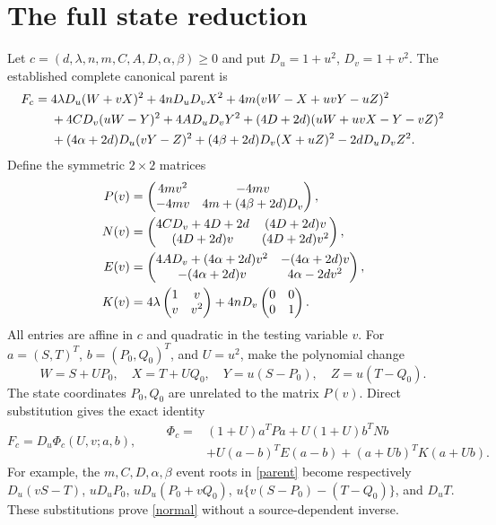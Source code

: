 \documentclass[11pt]{article}
\begin{document}
\section{The full state reduction}
Let $c=(d,\lambda,n,m,C,A,D,\alpha,\beta)\geq0$ and put
$D_u=1+u^2$, $D_v=1+v^2$.  The established complete canonical parent is
\begin{align}
F_c={}&4\lambda D_u(W+vX)^2+4nD_uD_vX^2
 +4m(vW-X+uvY-uZ)^2\notag\\
&+4CD_v(uW-Y)^2+4AD_uD_vY^2
 +(4D+2d)(uW+uvX-Y-vZ)^2\notag\\
&+(4\alpha+2d)D_u(vY-Z)^2
 +(4\beta+2d)D_v(X+uZ)^2-2dD_uD_vZ^2.\label{parent}
\end{align}
Define the symmetric
$2\times2$ matrices
\begin{align}
P(v)&=\begin{pmatrix}
4mv^2&-4mv\\-4mv&4m+(4\beta+2d)D_v
\end{pmatrix},\notag\\
N(v)&=\begin{pmatrix}
4CD_v+4D+2d&(4D+2d)v\\(4D+2d)v&(4D+2d)v^2
\end{pmatrix},\label{blocks}\\
E(v)&=\begin{pmatrix}
4AD_v+(4\alpha+2d)v^2&-(4\alpha+2d)v\\
-(4\alpha+2d)v&4\alpha-2dv^2
\end{pmatrix},\notag\\
K(v)&=4\lambda\begin{pmatrix}1&v\\v&v^2\end{pmatrix}
       +4nD_v\begin{pmatrix}0&0\\0&1\end{pmatrix}.\notag
\end{align}
All entries are affine in $c$ and quadratic in the testing variable $v$.
For $a=(S,T)^T$, $b=(P_0,Q_0)^T$, and $U=u^2$, make the polynomial change
\begin{equation}
W=S+UP_0,\quad X=T+UQ_0,\quad
Y=u(S-P_0),\quad Z=u(T-Q_0).\label{change}
\end{equation}
The state coordinates $P_0,Q_0$ are unrelated to the matrix $P(v)$.
Direct substitution gives the exact identity
\begin{equation}
F_c=D_u\Phi_c(U,v;a,b),\qquad
\boxed{\begin{aligned}
\Phi_c={}&(1+U)a^TPa+U(1+U)b^TNb\\
 &+U(a-b)^TE(a-b)+(a+Ub)^TK(a+Ub).
\end{aligned}}\label{normal}
\end{equation}
For example, the $m,C,D,\alpha,\beta$ event roots in \eqref{parent}
become respectively
$D_u(vS-T)$, $uD_uP_0$, $uD_u(P_0+vQ_0)$,
$u\{v(S-P_0)-(T-Q_0)\}$, and $D_uT$.
These substitutions prove \eqref{normal} without a source-dependent inverse.
\end{document}
